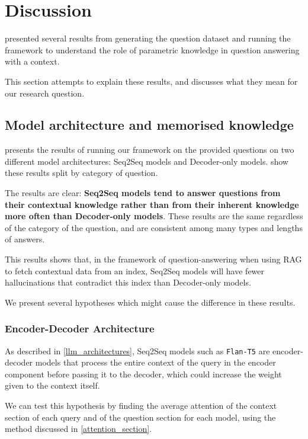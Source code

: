 \section{Discussion}
\label{discussion}

 presented several results from generating the question dataset and running the framework to understand the role of parametric knowledge in question answering with a context.

This section attempts to explain these results, and discusses what they mean for our research question.

\subsection{Model architecture and memorised knowledge}
\label{model_architecture_parametric}

 presents the results of running our framework on the provided questions on two different model architectures: Seq2Seq models and Decoder-only models.
 show these results split by category of question.

The results are clear: \textbf{Seq2Seq models tend to answer questions from their contextual knowledge rather than from their inherent knowledge more often than Decoder-only models}.
These results are the same regardless of the category of the question, and are consistent among many types and lengths of answers.

This results shows that, in the framework of question-answering when using RAG to fetch contextual data from an index, Seq2Seq models will have fewer hallucinations that contradict this index than Decoder-only models.

We present several hypotheses which might cause the difference in these results.

\subsubsection{Encoder-Decoder Architecture}

As described in \cref{llm_architectures}, Seq2Seq models such as \texttt{Flan-T5} are encoder-decoder models that process the entire context of the query in the encoder component before passing it to the decoder, which could increase the weight given to the context itself.

We can test this hypothesis by finding the average attention of the context section of each query and of the question section for each model, using the method discussed in \cref{attention_section}.

